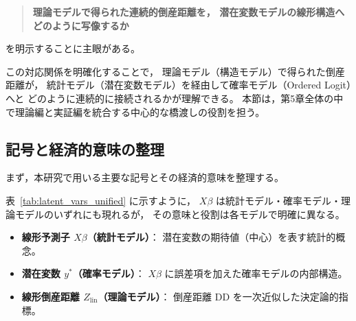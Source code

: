 \begin{quote}
\textbf{理論モデルで得られた連続的倒産距離を，  
潜在変数モデルの線形構造へどのように写像するか}
\end{quote}

を明示することに主眼がある。

この対応関係を明確化することで，
理論モデル（構造モデル）で得られた倒産距離が，
統計モデル（潜在変数モデル）を経由して確率モデル（Ordered Logit）へと
どのように連続的に接続されるかが理解できる。
本節は，第5章全体の中で理論編と実証編を統合する中心的な橋渡しの役割を担う。



\subsection{記号と経済的意味の整理}

まず，本研究で用いる主要な記号とその経済的意味を整理する。

\begin{table}[H]
\centering
\caption{潜在変数／倒産距離／閾値の記号整理}
\label{tab:latent_vars_unified}
\end{table}

表~\ref{tab:latent_vars_unified} に示すように，
$X\beta$ は統計モデル・確率モデル・理論モデルのいずれにも現れるが，
その意味と役割は各モデルで明確に異なる。

\begin{itemize}
    \item \textbf{線形予測子 $X\beta$（統計モデル）}：  
    潜在変数の期待値（中心）を表す統計的概念。
    \item \textbf{潜在変数 $y^*$（確率モデル）}：  
    $X\beta$ に誤差項を加えた確率モデルの内部構造。
    \item \textbf{線形倒産距離 $Z_{\text{lin}}$（理論モデル）}：  
    倒産距離 DD を一次近似した決定論的指標。
\end{itemize}


